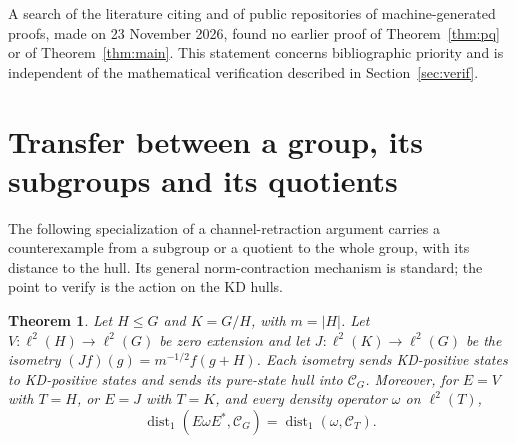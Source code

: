 \documentclass[11pt,a4paper]{article}
\newtheorem{theorem}{Theorem}
\theoremstyle{definition}
\theoremstyle{plain}
\newenvironment{statementframe}{%
  \par\addvspace{0.55\baselineskip}\noindent
  \begingroup\setlength{\fboxrule}{0.3pt}\setlength{\fboxsep}{7pt}%
  \begin{lrbox}{\statementbox}%
  \begin{minipage}{\dimexpr\linewidth-2\fboxsep-2\fboxrule\relax}%
}{%
  \end{minipage}\end{lrbox}%
  {\color{black!45}\fbox{\color{black}\usebox{\statementbox}}}%
  \endgroup\par\addvspace{0.45\baselineskip}%
}
\DeclareMathOperator{\dist}{dist}
\newcommand{\hull}{\mathcal C}
\begin{document}
A search of the literature citing \cite{DLR} and of public repositories of
machine-generated proofs, made on 23 November 2026, found no earlier proof of
Theorem~\ref{thm:pq} or of Theorem~\ref{thm:main}. This statement concerns
bibliographic priority and is independent of the mathematical verification
described in Section~\ref{sec:verif}.

\section{Transfer between a group, its subgroups and its quotients}
\label{sec:transfer}
The following specialization of a channel-retraction argument carries a
counterexample from a subgroup or a quotient to the whole group, with its
distance to the hull. Its general norm-contraction mechanism is standard; the
point to verify is the action on the KD hulls.

\begin{statementframe}
\begin{theorem}\label{thm:lift}
Let $H\leq G$ and $K=G/H$, with $m=|H|$. Let $V:\ell^2(H)\to\ell^2(G)$
be zero extension and let $J:\ell^2(K)\to\ell^2(G)$ be the isometry
$(Jf)(g)=m^{-1/2}f(g+H)$. Each isometry sends KD-positive states to
KD-positive states and sends its pure-state hull into $\hull_G$.
Moreover, for $E=V$ with $T=H$, or $E=J$ with $T=K$, and every density
operator $\omega$ on $\ell^2(T)$,
\begin{equation}\label{eq:isometry}
 \dist_1(E\omega E^*,\hull_G)=\dist_1(\omega,\hull_T).
\end{equation}
\end{theorem}
\end{statementframe}
\end{document}

